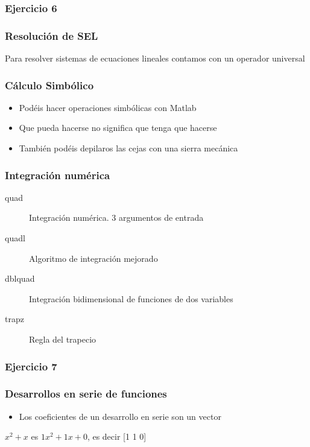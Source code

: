 \documentclass[12pt]{beamer}
\begin{document}
\begin{large}
\begin{frame}
\frametitle{Ejercicio 6}
\end{frame}


\begin{frame}
\frametitle{Resolución de SEL}

Para resolver sistemas de ecuaciones lineales contamos con un operador
universal
\testcode
\end{frame}

\begin{frame}
\frametitle{Cálculo Simbólico}
\begin{itemize}
\item Podéis hacer operaciones simbólicas con Matlab
\pause
\item Que pueda hacerse no significa que tenga que hacerse
\pause
\item También podéis depilaros las cejas con una sierra mecánica
\end{itemize}
\end{frame}

\begin{frame}
\frametitle{Integración numérica}
\begin{description}
\item[quad] Integración numérica. 3 argumentos de entrada
\item[quadl] Algoritmo de integración mejorado
\item[dblquad] Integración bidimensional de funciones de dos variables
\item[trapz] Regla del trapecio
\end{description}
\end{frame}

\begin{frame}
\frametitle{Ejercicio 7}
\end{frame}


\begin{frame}
\frametitle{Desarrollos en serie de funciones}
\begin{itemize}
\item Los coeficientes de un desarrollo en serie son un vector
\end{itemize}
$x^2 + x$ es $1x^2+1x+0$, es decir [1 1 0]
\testcode
\end{frame}


\end{large}
\end{document}
